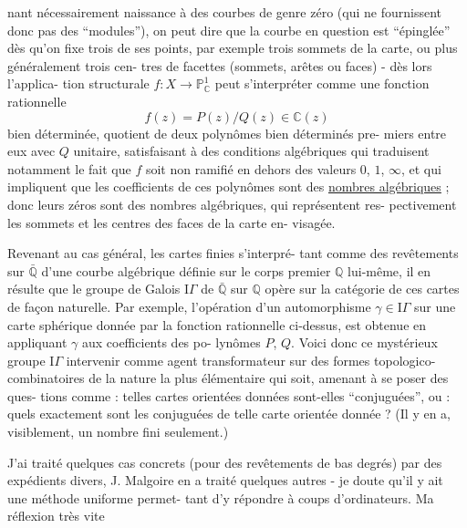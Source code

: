 
nant nécessairement naissance à des courbes de genre zéro (qui ne
fournissent donc pas des ``modules''), on peut dire que la courbe
en question est ``épinglée'' dès qu'on fixe trois de ses points, par
exemple trois sommets de la carte, ou plus généralement trois cen-%
tres de facettes (sommets, arêtes ou faces) - dès lors l'applica-%
tion structurale $f : X \to \mathbb{P}^{1}_{\mathbb{C}}$ peut s'interpréter comme une fonction
rationnelle
\[ f(z) = P(z)/Q(z) \in \mathbb{C}(z) \]
bien déterminée, quotient de deux polynômes bien déterminés pre-%
miers entre eux avec $Q$ unitaire, satisfaisant à des conditions
algébriques qui traduisent notamment le fait que $f$ soit non
ramifié en dehors des valeurs $0$, $1$, $\infty$, et qui impliquent que les
coefficients de ces polynômes sont des \uline{nombres algébriques} ; donc
leurs zéros sont des nombres algébriques, qui représentent res-%
pectivement les sommets et les centres des faces de la carte en-%
visagée.

Revenant au cas général, les cartes finies s'interpré-%
tant comme des revêtements sur $\bar{\mathbb{Q}}$ d'une courbe algébrique définie
sur le corps premier $\mathbb{Q}$ lui-même, il en résulte que le groupe de
Galois $\mathrm{I}\!\Gamma$ de $\bar{\mathbb{Q}}$ sur $\mathbb{Q}$ opère sur la catégorie de ces cartes de
façon naturelle. Par exemple, l'opération d'un automorphisme
$\gamma \in \mathrm{I}\!\Gamma$ sur une carte sphérique donnée par la fonction rationnelle
ci-dessus, est obtenue en appliquant $\gamma$ aux coefficients des po-%
lynômes $P$, $Q$. Voici donc ce mystérieux groupe $\mathrm{I}\!\Gamma$ intervenir comme
agent transformateur sur des formes topologico-combinatoires de la
nature la plus élémentaire qui soit, amenant à se poser des ques-%
tions comme : telles cartes orientées données sont-elles ``conjuguées'',
ou : quels exactement sont les conjuguées de telle carte orientée
donnée ? (Il y en a, visiblement, un nombre fini seulement.)

J'ai traité quelques cas concrets (pour des revêtements
de bas degrés) par des expédients divers, J. Malgoire en a traité
quelques autres - je doute qu'il y ait une méthode uniforme permet-%
tant d'y répondre à coups d'ordinateurs. Ma réflexion très vite

